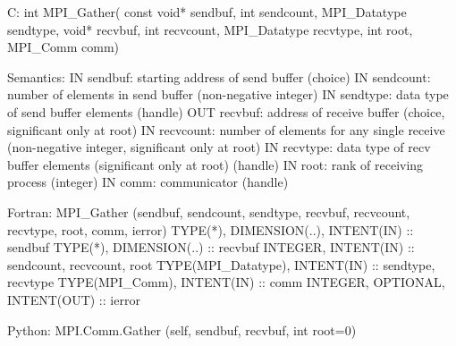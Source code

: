 C:
int MPI_Gather(
  const void* sendbuf, int sendcount, MPI_Datatype sendtype,
  void* recvbuf, int recvcount, MPI_Datatype recvtype,
  int root, MPI_Comm comm)

Semantics:
IN sendbuf: starting address of send buffer (choice)
IN sendcount: number of elements in send buffer (non-negative integer)
IN sendtype: data type of send buffer elements (handle)
OUT recvbuf: address of receive buffer (choice, significant only at root)
IN recvcount: number of elements for any single receive (non-negative integer, significant only at root)
IN recvtype: data type of recv buffer elements (significant only at root) (handle)
IN root: rank of receiving process (integer)
IN comm: communicator (handle)

Fortran:
MPI_Gather
   (sendbuf, sendcount, sendtype, recvbuf, recvcount, recvtype, 
    root, comm, ierror)
TYPE(*), DIMENSION(..), INTENT(IN) :: sendbuf
TYPE(*), DIMENSION(..) :: recvbuf
INTEGER, INTENT(IN) :: sendcount, recvcount, root
TYPE(MPI_Datatype), INTENT(IN) :: sendtype, recvtype
TYPE(MPI_Comm), INTENT(IN) :: comm
INTEGER, OPTIONAL, INTENT(OUT) :: ierror

Python:
MPI.Comm.Gather
   (self, sendbuf, recvbuf, int root=0)
